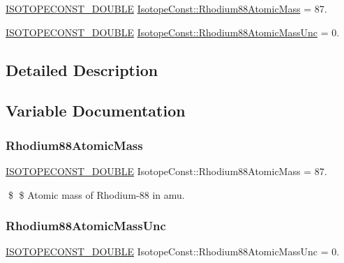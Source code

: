 \begin{DoxyCompactItemize}
\item 
\mbox{\hyperlink{group___isotope_const-_macros_ga8f45a7272ce02c0b4c65c44636ed719a}{I\+S\+O\+T\+O\+P\+E\+C\+O\+N\+S\+T\+\_\+\+D\+O\+U\+B\+LE}} \mbox{\hyperlink{group___isotope_const-_rhodium-_rh88_gace8c613ef3bb570cc20e20f4c3287ac8}{Isotope\+Const\+::\+Rhodium88\+Atomic\+Mass}} = 87.
\item 
\mbox{\hyperlink{group___isotope_const-_macros_ga8f45a7272ce02c0b4c65c44636ed719a}{I\+S\+O\+T\+O\+P\+E\+C\+O\+N\+S\+T\+\_\+\+D\+O\+U\+B\+LE}} \mbox{\hyperlink{group___isotope_const-_rhodium-_rh88_ga54ab377dcd951fba3a551b2fb6043695}{Isotope\+Const\+::\+Rhodium88\+Atomic\+Mass\+Unc}} = 0.
\end{DoxyCompactItemize}


\subsection{Detailed Description}


\subsection{Variable Documentation}
\mbox{\label{group___isotope_const-_rhodium-_rh88_gace8c613ef3bb570cc20e20f4c3287ac8}} 
\subsubsection{\texorpdfstring{Rhodium88\+Atomic\+Mass}{Rhodium88AtomicMass}}
{\footnotesize\ttfamily \mbox{\hyperlink{group___isotope_const-_macros_ga8f45a7272ce02c0b4c65c44636ed719a}{I\+S\+O\+T\+O\+P\+E\+C\+O\+N\+S\+T\+\_\+\+D\+O\+U\+B\+LE}} Isotope\+Const\+::\+Rhodium88\+Atomic\+Mass = 87.}

\$ \$ Atomic mass of Rhodium-\/88 in amu. \mbox{\label{group___isotope_const-_rhodium-_rh88_ga54ab377dcd951fba3a551b2fb6043695}} 
\subsubsection{\texorpdfstring{Rhodium88\+Atomic\+Mass\+Unc}{Rhodium88AtomicMassUnc}}
{\footnotesize\ttfamily \mbox{\hyperlink{group___isotope_const-_macros_ga8f45a7272ce02c0b4c65c44636ed719a}{I\+S\+O\+T\+O\+P\+E\+C\+O\+N\+S\+T\+\_\+\+D\+O\+U\+B\+LE}} Isotope\+Const\+::\+Rhodium88\+Atomic\+Mass\+Unc = 0.}

